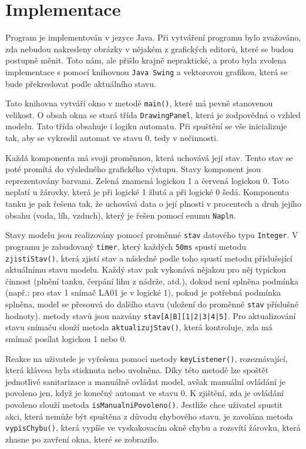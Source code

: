 \documentclass[12pt, a4paper]{article}
\begin{document}
\section{Implementace}
Program je implementován v jezyce Java. Při vytváření programu bylo zvažováno, zda nebudou nakresleny obrázky v nějakém z grafických editorů, které se budou postupně měnit. Toto nám, ale přišlo krajně nepraktické, a proto byla zvolena implementace s pomocí knihovnou \texttt{Java Swing} a vektorovou grafikou, která se bude překreslovat podle aktuálního stavu. 

\vspace{0.25cm}
Tato knihovna vytváří okno v metodě \texttt{main()}, které má pevně stanovenou velikost. O obsah okna se stará třída \texttt{DrawingPanel}, která je zodpovědná o vzhled modelu. Tato třída obsahuje i logiku automatu. Při spuštění se vše inicializuje tak, aby se vykreslil automat ve stavu 0, tedy v nečinnosti.

\vspace{0.25cm}
Každá komponenta má svoji proměnnou, která uchovává její stav. Tento stav se poté promítá do výsledného grafického výstupu. Stavy komponent jsou reprezentovány barvami. Zelená znamená logickou 1 a červená logickou 0. Toto neplatí u žárovky, která je při logické 1 žlutá a při logické 0 šedá. Komponenta tanku je pak řešena tak, že uchovává data o její plnosti v procentech a druh jejího obsahu (voda, líh, vzduch), který je řešen pomocí enumu \texttt{Napln}.

\vspace{0.25cm}
Stavy modelu jsou realizovány pomocí proměnné \texttt{stav} datového typu \texttt{Integer}. V programu je zabudovaný \texttt{timer}, který každých \texttt{50ms} spustí metodu \newline \texttt{zjistiStav()}, která zjistí stav a následně podle toho spustí metodu příslušející aktuálnímu stavu modelu. Každý stav pak vykonává nějakou pro něj typickou činnost (plnění tanku, čerpání lihu z nádrže, atd.), dokud není splněna podmínka (např.: pro stav 1 snímač LA01 je v logické 1), pokud je potřebná podmínka splněna, model se přesouvá do dalšího stavu (uložení do proměnné \texttt{stav} příslušné hodnoty). metody stavů jsou nazvány \texttt{stav[A|B][1|2|3|4|5]}. Pro aktualizování stavu snímaču slouží metoda \texttt{aktualizujStav()}, která kontroluje, zda má smímač posílat logickou 1 nebo 0.

\vspace{0.25cm}
Reakce na uživatele je vyřešena pomocí metody \texttt{keyListener()}, rozeznávající, která klávesa byla stisknuta nebo uvolněna. Díky této metodě lze spoštět jednotlivé sanitarizace a manuálně ovládat model, avšak manuální ovládání je povoleno jen, když je konečný automat ve stavu 0. K zjištění, zda je ovládání povoleno slouží metoda \texttt{isManualniPovoleno()}. Jestliže chce uživatel spustit akci, která nemůže být spuštěna z důvodu chybového stavu, je zavolána metoda \texttt{vypisChybu()}, která vypíše ve vyskakovacím okně chybu a rozsvítí žárovku, která zhasne po zavření okna, které se zobrazilo.
\end{document}
